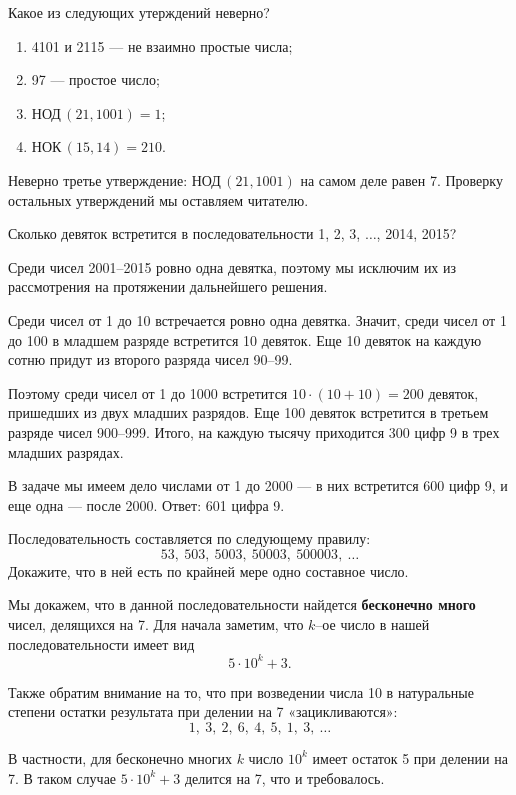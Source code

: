\begin{itemize}

	\itA Какое из следующих утерждений неверно?
	
	\begin{enumerate}[label=\arabic*)]
		\item 4101 и 2115 — не взаимно простые числа;
		\item 97 — простое число;
		\item $\text{НОД}\,(21,1001)=1$;
		\item $\text{НОК}\,(15,14)=210$.
	\end{enumerate}
	
	\itr Неверно третье утверждение: $\text{НОД}\,(21,1001)$ на самом \linebreak деле равен 7. Проверку остальных утверждений мы оставляем читателю.
	
	\itB Сколько девяток встретится в последовательности 1, 2, 3, $\ldots$, 2014, 2015?
	
	\itr Среди чисел 2001–2015 ровно одна девятка, поэтому мы исключим их из рассмотрения на протяжении дальнейшего решения.
	
	Среди чисел от 1 до 10 встречается ровно одна девятка. Значит, среди чисел от 1 до 100 в младшем разряде встретится 10 девяток. Еще 10 девяток на каждую сотню придут из второго разряда чисел 90–99.
	
	Поэтому среди чисел от 1 до 1000 встретится $10 \cdot (10+10) = 200$ девяток, пришедших из двух младших разрядов. Еще 100 девяток встретится в третьем разряде чисел 900–999. Итого, на каждую тысячу приходится 300 цифр 9 в трех младших разрядах.
	
	В задаче мы имеем дело числами от 1 до 2000 — в них встретится 600 цифр 9, и еще одна — после 2000. Ответ: 601 цифра 9.
	
	\itC Последовательность составляется по следующему правилу:
	$$53,\ 503,\ 5003,\ 50003,\ 500003,\ \ldots$$
	Докажите, что в ней есть по крайней мере одно составное число.
	
	\itr Мы докажем, что в данной последовательности найдется {\bfseries бесконечно много} чисел, делящихся на 7. Для начала заметим, что $k$--ое число в нашей последовательности имеет вид
	$$5\cdot 10^k + 3.$$
	
	Также обратим внимание на то, что при возведении числа 10 в натуральные степени остатки результата при делении на 7 «зацикливаются»:
	$$1,\ 3,\ 2,\ 6,\ 4,\ 5,\ 1,\ 3,\ \ldots$$
	
	В частности, для бесконечно многих $k$ число $10^k$ имеет остаток 5 \linebreak при делении на 7. В таком случае $5 \cdot 10^k + 3$ делится на 7, что и требовалось.

\end{itemize}

